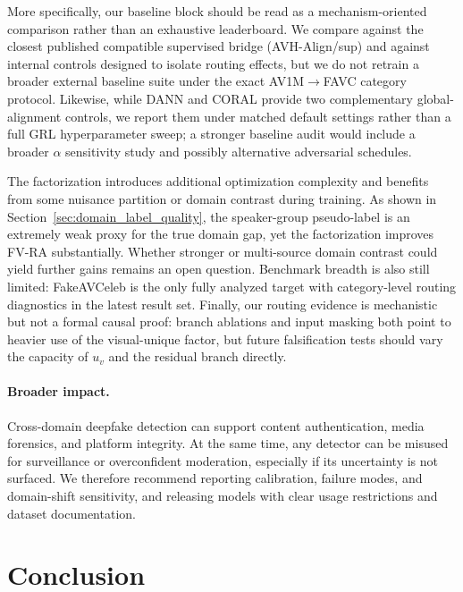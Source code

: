 \documentclass{article}
\begin{document}
More specifically, our baseline block should be read as a mechanism-oriented comparison rather than an exhaustive leaderboard. We compare against the closest published compatible supervised bridge (AVH-Align/sup) and against internal controls designed to isolate routing effects, but we do not retrain a broader external baseline suite under the exact AV1M$\rightarrow$FAVC category protocol. Likewise, while DANN and CORAL provide two complementary global-alignment controls, we report them under matched default settings rather than a full GRL hyperparameter sweep; a stronger baseline audit would include a broader $\alpha$ sensitivity study and possibly alternative adversarial schedules.

The factorization introduces additional optimization complexity and benefits from some nuisance partition or domain contrast during training. As shown in Section~\ref{sec:domain_label_quality}, the speaker-group pseudo-label is an extremely weak proxy for the true domain gap, yet the factorization improves FV-RA substantially. Whether stronger or multi-source domain contrast could yield further gains remains an open question. Benchmark breadth is also still limited: FakeAVCeleb is the only fully analyzed target with category-level routing diagnostics in the latest result set. Finally, our routing evidence is mechanistic but not a formal causal proof: branch ablations and input masking both point to heavier use of the visual-unique factor, but future falsification tests should vary the capacity of $u_v$ and the residual branch directly.

\paragraph{Broader impact.}
Cross-domain deepfake detection can support content authentication, media forensics, and platform integrity. At the same time, any detector can be misused for surveillance or overconfident moderation, especially if its uncertainty is not surfaced. We therefore recommend reporting calibration, failure modes, and domain-shift sensitivity, and releasing models with clear usage restrictions and dataset documentation.

\section{Conclusion}
\end{document}
